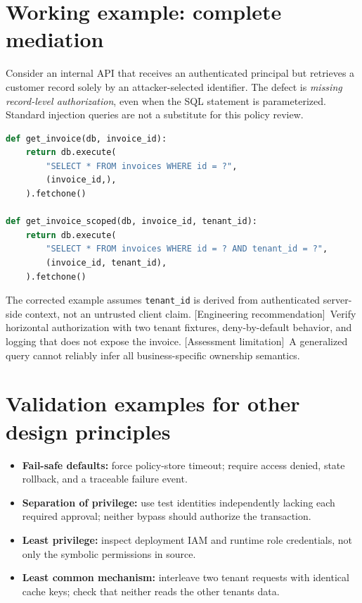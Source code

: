 \documentclass[11pt,letterpaper,oneside]{book}
\newcommand{\srcR}{\textsf{[Engineering recommendation]}}
\newcommand{\limt}{\textsf{[Assessment limitation]}}
\begin{document}
\section{Working example: complete mediation}

Consider an internal API that receives an authenticated principal but retrieves a customer record solely by an attacker-selected identifier. The defect is \emph{missing record-level authorization}, even when the SQL statement is parameterized. Standard injection queries are not a substitute for this policy review.

\begin{lstlisting}[caption={Python: unscoped and tenant-scoped retrieval},language=Python]
def get_invoice(db, invoice_id):
    return db.execute(
        "SELECT * FROM invoices WHERE id = ?",
        (invoice_id,),
    ).fetchone()

def get_invoice_scoped(db, invoice_id, tenant_id):
    return db.execute(
        "SELECT * FROM invoices WHERE id = ? AND tenant_id = ?",
        (invoice_id, tenant_id),
    ).fetchone()
\end{lstlisting}

The corrected example assumes \texttt{tenant\_id} is derived from authenticated server-side context, not an untrusted client claim. \srcR\ Verify horizontal authorization with two tenant fixtures, deny-by-default behavior, and logging that does not expose the invoice. \limt\ A generalized query cannot reliably infer all business-specific ownership semantics.

\section{Validation examples for other design principles}

\begin{itemize}
\item \textbf{Fail-safe defaults:} force policy-store timeout; require access denied, state rollback, and a traceable failure event.
\item \textbf{Separation of privilege:} use test identities independently lacking each required approval; neither bypass should authorize the transaction.
\item \textbf{Least privilege:} inspect deployment IAM and runtime role credentials, not only the symbolic permissions in source.
\item \textbf{Least common mechanism:} interleave two tenant requests with identical cache keys; check that neither reads the other tenant\textquotesingle s data.
\end{itemize}
\end{document}
